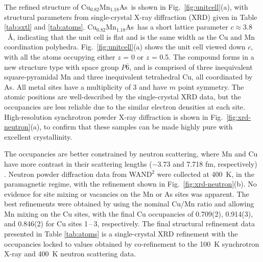 \documentclass[10pt,doublespacing,edeposit]{uiucthesis2020}
\newcommand*{\cumnas}{Cu$_{0.82}$Mn$_{1.18}$As}
\begin{document}
\begin{mainmatter}
The refined structure of \cumnas\ is shown in Fig.\ \ref{fig:unitcell}(a), with structural parameters from single-crystal X-ray diffraction (XRD) given in Table \ref{tab:sxtl} and \ref{tab:atoms}.
{\color{black}\cumnas\ has a short lattice parameter $c \approx 3.8$~\AA, indicating that the unit cell is flat and is the same width as the Cu and Mn coordination polyhedra. Fig.\ \ref{fig:unitcell}(a) shows the unit cell viewed down $c$, with all the atoms occupying either $z$ = 0 or $z$ = 0.5.}
The compound forms in a new structure type with space group $P\overline{6}$, and is comprised of three inequivalent square-pyramidal Mn and three inequivalent tetrahedral Cu, all coordinated by As.
All metal sites have a multiplicity of 3 {\color{black} and have $m$ point symmetry}. The atomic positions are well-described by the single-crystal XRD data, but the occupancies are less reliable due to the similar electron densities at each site.  
High-resolution synchrotron powder X-ray diffraction is shown in Fig.\ \ref{fig:xrd-neutron}(a), to confirm that these samples can be made highly pure with excellent crystallinity.

The occupancies are better constrained by neutron scattering, where Mn and Cu have more contrast in their scattering lengths ($-3.73$ and 7.718 fm, respectively) \cite{sears_neutron_1992}.
Neutron powder diffraction data from WAND$^2$ were collected at 400~K, in the paramagnetic regime, with the refinement shown in Fig.\ \ref{fig:xrd-neutron}(b). 
No evidence for site mixing or vacancies on the Mn or As sites was apparent. 
The best refinements were obtained by using the nominal Cu/Mn ratio and allowing Mn mixing on the Cu sites, with the final Cu occupancies of 0.709(2), 0.914(3), and 0.846(2) for Cu sites 1\,--\,3, respectively.
The final structural refinement data presented in Table \ref{tab:atoms} is a single-crystal XRD refinement with the occupancies locked to values obtained by co-refinement to the 100~K synchrotron X-ray and 400~K neutron scattering data. 


\end{mainmatter}
\end{document}
